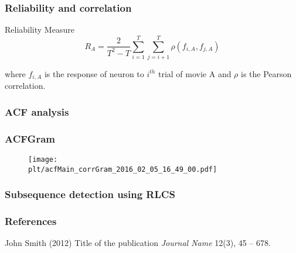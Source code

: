 \documentclass{beamer}
\newcommand{\plt}{../../plots}
\begin{document}
\begin{frame}
\frametitle{Reliability and correlation}
\begin{block}{Reliability Measure}
$$R_A = \frac{2}{T^2 - T}\sum_{i=1}^T \sum_{j=i+1}^T \rho(f_{i, A}, f_{j, A})$$
\end{block}
where $f_{i, A}$ is the response of neuron to $i^{th}$ trial of movie A and $\rho$ is the Pearson correlation.
\end{frame}

\begin{frame}
\frametitle{ACF analysis}

\end{frame}

\begin{frame}
\frametitle{ACFGram}
\begin{figure}
\texttt{[image: \\plt/acfMain\_corrGram\_2016\_02\_05\_16\_49\_00.pdf]}
\end{figure}
\end{frame}

\begin{frame}
\frametitle{Subsequence detection using RLCS}

\end{frame}

\begin{frame}
\frametitle{References}
\footnotesize{
\begin{thebibliography}{99} %
 John Smith (2012)
\newblock Title of the publication
\newblock \emph{Journal Name} 12(3), 45 -- 678.
\end{thebibliography}
}
\end{frame}
\end{document}
